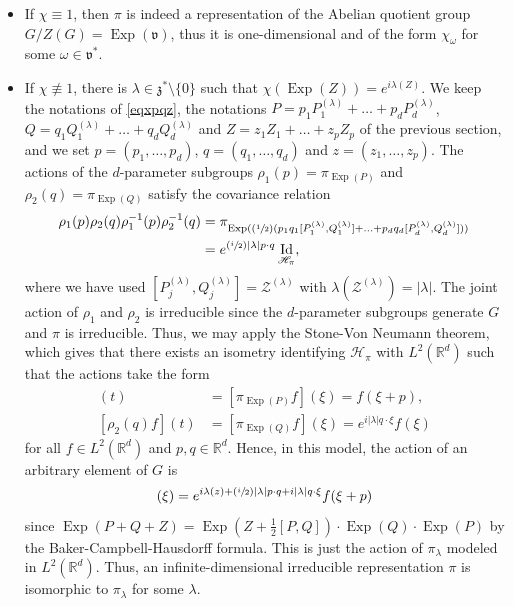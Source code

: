 \documentclass[JEP,XML,SOM,Unicode,published]{cedram}
\let\mathcal\mathscr
\newcommand{\Psfrac}[2]{(\sfrac{#1}{#2})}
\DeclareMathOperator{\Exp}{Exp}
\DeclareMathOperator{\Id}{Id}
\theoremstyle{plain}
\theoremstyle{definition}
\def\R{{\mathbb R}}
\begin{document}
\begin{itemize}
\item
If $\chi\equiv 1$, then $\pi$ is indeed a representation of the Abelian quotient group $G/Z(G)=\Exp(\mathfrak v)$, thus it is one-dimensional and of the form $\chi_\omega$ for some $\omega\in \mathfrak v^*$.

\item
If $\chi\not\equiv 1$, there is $\lambda\in \mathfrak z^*\setminus \{0\}$ such that $\chi(\Exp(Z))=e^{i\lambda(Z)}$. We keep the notations of \eqref{eqxpqz}, the notations $P=p_1P_1^{(\lambda)}+\ldots+p_dP_d^{(\lambda)}$, $Q=q_1Q_1^{(\lambda)}+\ldots+q_dQ_d^{(\lambda)}$ and $Z=z_1Z_1+\ldots+z_pZ_p$ of the previous section, and we set $p=(p_1,\ldots,p_d)$, $q=(q_1,\ldots,q_d)$ and $z=(z_1,\ldots,z_p)$.
The actions of the $d$-parameter subgroups $\rho_1(p)=\pi_{\Exp(P)}$ and $\rho_2(q)=\pi_{\Exp(Q)}$ satisfy the covariance relation
\begin{align*}
\rho_1(p)\rho_2(q)\rho_1^{-1}(p)\rho_2^{-1}(q)&=\pi_{\Exp(\Psfrac12(p_1q_1[P_1^{(\lambda)},Q_1^{(\lambda)}]+\ldots+p_dq_d[P_d^{(\lambda)},Q_d^{(\lambda)}]))} \\
&=e^{\Psfrac{i}{2}|\lambda|p\cdot q}\Id_{\mathcal{H}_\pi},
\end{align*}
where we have used $[P_j^{(\lambda)},Q_j^{(\lambda)}]= \mathcal Z^{(\lambda)}$ with $\lambda(\mathcal Z^{(\lambda)})=|\lambda|$.
The joint action of $\rho_1$ and $\rho_2$ is irreducible since the $d$-parameter subgroups generate $G$ and $\pi$ is irreducible. Thus, we may apply the Stone-Von Neumann theorem, which gives that there exists an isometry identifying $\mathcal{H}_\pi$ with $L^2(\R^d)$ such that the actions take the form
\begin{align*}
[\rho_1(p)f](t)&=[\pi_{\Exp(P)}f](\xi)=f(\xi+p), \\
[\rho_2(q)f](t)&=[\pi_{\Exp(Q)}f](\xi)=e^{i|\lambda| q\cdot \xi}f(\xi)
\end{align*}
for all $f\in L^2(\R^d)$ and $p,q\in\R^d$.
Hence, in this model, the action of an arbitrary element of $G$ is
\begin{equation*}
[\pi_{\Exp(P+Q+Z)}f](\xi)=e^{i\lambda(z)+\Psfrac{i}{2}|\lambda|p\cdot q+i|\lambda|q\cdot \xi}f(\xi+p)
\end{equation*}
since $\Exp(P+Q+Z)=\Exp(Z+\frac{1}{2}[P,Q])\cdot\Exp(Q)\cdot\Exp(P)$ by the Baker-Campbell-Hausdorff formula. This is just the action of $\pi_\lambda$ modeled in $L^2(\R^d)$. Thus, an infinite-dimensional irreducible representation $\pi$ is isomorphic to $\pi_\lambda$ for some $\lambda$.
\end{itemize}
\end{document}
